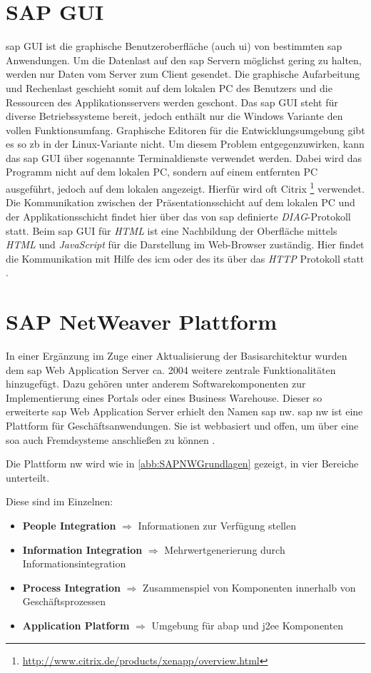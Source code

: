 \section{SAP GUI}
\label{sec:sapgui}
\gls{sap} GUI ist die graphische Benutzeroberfläche (auch \gls{ui}) von bestimmten \gls{sap} Anwendungen. Um die Datenlast auf den \gls{sap} Servern möglichst gering zu halten, werden nur Daten vom Server zum Client gesendet. Die graphische Aufarbeitung und Rechenlast geschieht somit auf dem lokalen PC des Benutzers und die Ressourcen des Applikationsservers werden geschont.
Das \gls{sap} GUI steht für diverse Betriebssysteme bereit, jedoch enthält nur die Windows Variante den vollen Funktionsumfang. Graphische Editoren für die Entwicklungsumgebung gibt es so \gls{zb} in der Linux-Variante nicht.
Um diesem Problem entgegenzuwirken, kann das \gls{sap} GUI über sogenannte Terminaldienste verwendet werden. Dabei wird das Programm nicht auf dem lokalen PC, sondern auf einem entfernten PC ausgeführt, jedoch auf dem lokalen angezeigt. Hierfür wird oft Citrix \footnote{\url{http://www.citrix.de/products/xenapp/overview.html}} verwendet.
Die Kommunikation zwischen der Präsentationsschicht auf dem lokalen PC und der Applikationsschicht findet hier über das von \gls{sap} definierte \emph{DIAG}-Protokoll statt. Beim \gls{sap} GUI für \emph{HTML} ist eine Nachbildung der Oberfläche mittels \emph{HTML} und \emph{JavaScript} für die Darstellung im Web-Browser zuständig. Hier findet die Kommunikation mit Hilfe des \gls{icm} oder des \gls{its} über das \emph{HTTP} Protokoll statt \cite{SAPTEC}.

\section{SAP NetWeaver Plattform}
\label{sec:netweaver}
In einer Ergänzung im Zuge einer Aktualisierung der Basisarchitektur wurden dem \gls{sap} Web Application Server ca. 2004 weitere zentrale Funktionalitäten hinzugefügt. Dazu gehören unter anderem Softwarekomponenten zur Implementierung eines Portals oder eines Business Warehouse. Dieser so erweiterte \gls{sap} Web Application Server erhielt den Namen \gls{sap} \gls{nw}. \gls{sap} \gls{nw} ist eine Plattform für Geschäftsanwendungen. Sie ist webbasiert und offen, um über eine \gls{soa} auch Fremdsysteme anschließen zu können \cite{SAPTEC}.

Die Plattform \gls{nw} wird wie in \ref{abb:SAPNWGrundlagen} gezeigt, in vier Bereiche unterteilt.

Diese sind im Einzelnen:
\begin{itemize}
	\item \textbf{People Integration} $\Rightarrow$ Informationen zur Verfügung stellen
	\item \textbf{Information Integration} $\Rightarrow$ Mehrwertgenerierung durch Informationsintegration
	\item \textbf{Process Integration} $\Rightarrow$ Zusammenspiel von Komponenten innerhalb von Geschäftsprozessen
	\item \textbf{Application Platform} $\Rightarrow$ Umgebung für \gls{abap} und \gls{j2ee} Komponenten
\end{itemize}

